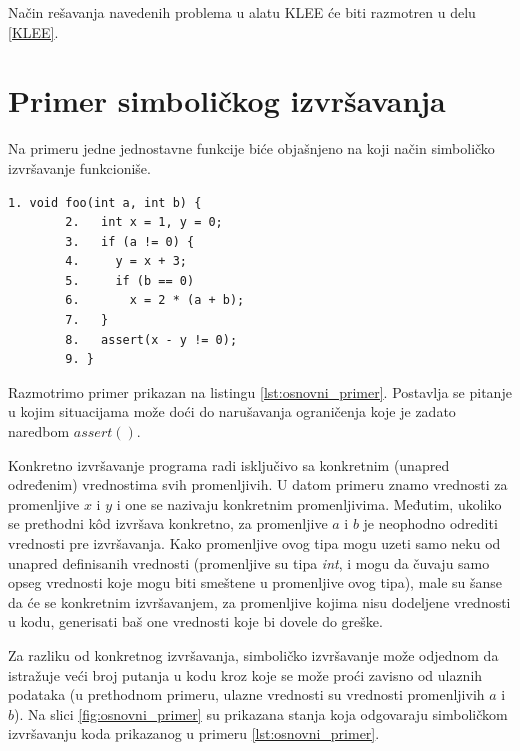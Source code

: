 \documentclass[12pt,oneside]{memoir}
\begin{document}
\noindent Način rešavanja navedenih problema u alatu KLEE će biti razmotren u delu \ref{KLEE}.

\section{Primer simboličkog izvršavanja}
Na primeru jedne jednostavne funkcije biće objašnjeno na koji način simboličko izvršavanje funkcioniše.

    \begin{lstlisting}[caption={Osnovni primer simboličkog izvršavanja},captionpos=b,label={lst:osnovni_primer}]
        1. void foo(int a, int b) {
        2.   int x = 1, y = 0;
        3.   if (a != 0) {
        4.     y = x + 3;
        5.     if (b == 0)
        6.       x = 2 * (a + b);
        7.   }
        8.   assert(x - y != 0);
        9. }
    \end{lstlisting}

\noindent Razmotrimo primer prikazan na listingu \ref{lst:osnovni_primer}. Postavlja se pitanje u kojim situacijama može doći do narušavanja ograničenja koje je zadato naredbom $assert()$. 

Konkretno izvršavanje programa radi isključivo sa konkretnim (unapred određenim) vrednostima svih promenljivih. U datom primeru znamo vrednosti za promenljive $x$ i $y$ i one se nazivaju konkretnim promenljivima. Međutim, ukoliko se prethodni k\^od izvršava konkretno, za promenljive $a$ i $b$ je neophodno odrediti vrednosti pre izvršavanja. Kako promenljive ovog tipa mogu uzeti samo neku od unapred definisanih vrednosti (promenljive su tipa \textit{int}, i mogu da čuvaju samo opseg vrednosti koje mogu biti smeštene u promenljive ovog tipa), male su šanse da će se konkretnim izvršavanjem, za promenljive kojima nisu dodeljene vrednosti u kodu, generisati baš one vrednosti koje bi dovele do greške. 

Za razliku od konkretnog izvršavanja, simboličko izvršavanje može odjednom da istražuje veći broj putanja u kodu kroz koje se može proći zavisno od ulaznih podataka (u prethodnom primeru, ulazne vrednosti su vrednosti promenljivih $a$ i $b$). Na slici \ref{fig:osnovni_primer} su prikazana stanja koja odgovaraju simboličkom izvršavanju koda prikazanog u primeru \ref{lst:osnovni_primer}. 
\end{document}
